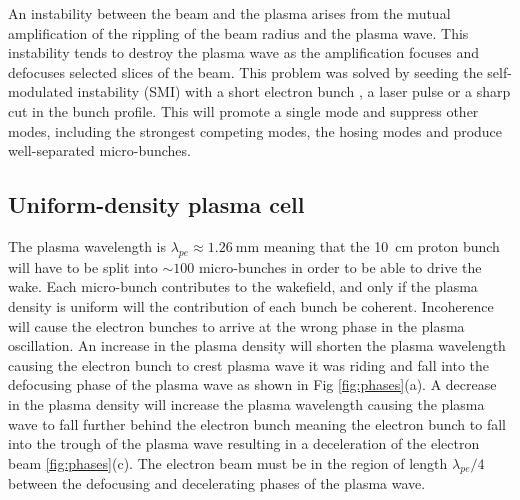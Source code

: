An instability between the beam and the plasma arises from the mutual
amplification of the rippling of the beam radius and the plasma wave. This
instability tends to destroy the plasma wave as the amplification focuses and
defocuses selected slices of the beam.  This problem was solved by seeding the
self-modulated instability (SMI) with a short electron bunch
\cite{lotov2013natural}, a laser pulse \cite{siemon2013laser} or a sharp cut in
the bunch profile\cite{kumar2010self}. This will promote a single mode and
suppress other modes, including the strongest competing modes, the hosing modes
\cite{vieira2014hosing} and produce well-separated micro-bunches.

\subsection{Uniform-density plasma cell}

The plasma wavelength is \(\lambda_{pe} \approx \SI{1.26}{\milli\meter}\)
meaning that the \SI{10}{\centi\meter} proton bunch will have to be split into
\(\sim 100\) micro-bunches in order to be able to drive the wake.  Each
micro-bunch contributes to the wakefield, and only if the plasma density is
uniform will the contribution of each bunch be coherent. Incoherence will cause
the electron bunches to arrive at the wrong phase in the plasma oscillation. An
increase in the plasma density will shorten the plasma wavelength causing the
electron bunch to crest plasma wave it was riding and fall into the defocusing
phase of the plasma wave as shown in Fig \ref{fig:phases}(a). A decrease
in the plasma density will increase the plasma wavelength causing the plasma
wave to fall further behind the electron bunch meaning the electron bunch to
fall into the trough of the plasma wave resulting in a deceleration of the
electron beam \ref{fig:phases}(c). The electron beam must be in the
region of length \(\lambda_{pe}/4\) between the defocusing and decelerating
phases of the plasma wave.

